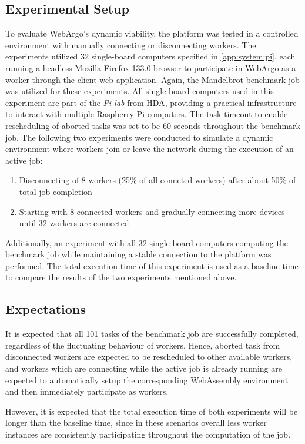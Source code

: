 \subsection{Experimental Setup}
To evaluate WebArgo's dynamic viability, the platform was tested in a controlled environment with manually connecting or disconnecting workers. The experiments utilized 32 single-board computers specified in \autoref{app:system:pi}, each running a headless Mozilla Firefox 133.0 \cite{background:firefox2} browser to participate in WebArgo as a worker through the client web application. Again, the Mandelbrot benchmark job was utilized for these experiments. All single-board computers used in this experiment are part of the \emph{Pi-lab} from \ac{HDA}, providing a practical infrastructure to interact with multiple Raspberry Pi computers. The task timeout to enable rescheduling of aborted tasks was set to be 60 seconds throughout the benchmark job. The following two experiments were conducted to simulate a dynamic environment where workers join or leave the network during the execution of an active job:
\begin{enumerate}
    \item Disconnecting of 8 workers (25\% of all conneted workers) after about 50\% of total job completion 
    \item Starting with 8 connected workers and gradually connecting more devices until 32 workers are connected
\end{enumerate}
Additionally, an experiment with all 32 single-board computers computing the benchmark job while maintaining a stable connection to the platform was performed. The total execution time of this experiment is used as a baseline time to compare the results of the two experiments mentioned above.

\subsection{Expectations}
It is expected that all 101 tasks of the benchmark job are successfully completed, regardless of the fluctuating behaviour of workers. Hence, aborted task from disconnected workers are expected to be rescheduled to other available workers, and workers which are connecting while the active job is already running are expected to automatically setup the corresponding WebAssembly environment and then immediately participate as workers.

However, it is expected that the total execution time of both experiments will be longer than the baseline time, since in these scenarios overall less worker instances are consistently participating throughout the computation of the job. 

